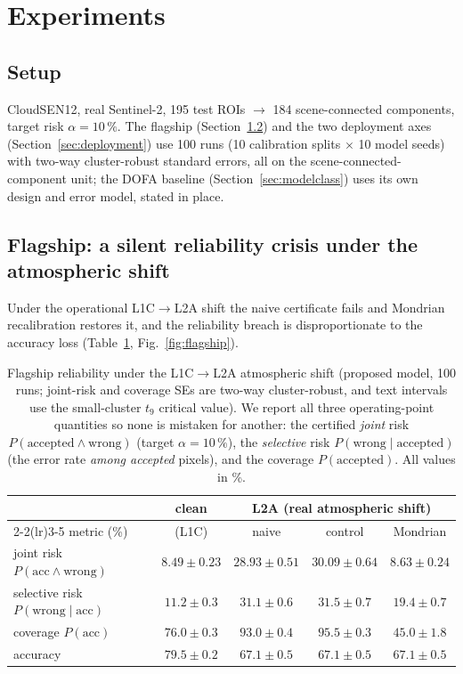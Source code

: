 \documentclass[preprint,3p,times]{elsarticle}
\begin{document}
\section{Experiments}
\subsection{Setup}
CloudSEN12, real Sentinel-2, 195 test ROIs $\to$ 184 scene-connected components, target risk $\alpha = 10\,\%$. The flagship (Section~\ref{sec:flagship}) and the two deployment axes (Section~\ref{sec:deployment}) use 100 runs (10 calibration splits $\times$ 10 model seeds) with two-way cluster-robust standard errors, all on the scene-connected-component unit; the DOFA baseline (Section~\ref{sec:modelclass}) uses its own design and error model, stated in place.

\subsection{Flagship: a silent reliability crisis under the atmospheric shift}
\label{sec:flagship}
Under the operational L1C$\to$L2A shift the naive certificate fails and Mondrian recalibration restores it, and the reliability breach is disproportionate to the accuracy loss (Table~\ref{tab:flagship}, Fig.~\ref{fig:flagship}).

\begin{table}[t]
\centering
\caption{Flagship reliability under the L1C$\to$L2A atmospheric shift (proposed model, 100 runs; joint-risk and coverage SEs are two-way cluster-robust, and text intervals use the small-cluster $t_9$ critical value). We report all three operating-point quantities so none is mistaken for another: the certified \emph{joint} risk $P(\text{accepted}\wedge\text{wrong})$ (target $\alpha = 10\,\%$), the \emph{selective} risk $P(\text{wrong}\mid\text{accepted})$ (the error rate \emph{among accepted} pixels), and the coverage $P(\text{accepted})$. All values in \%.}
\label{tab:flagship}
\begin{tabular}{lcccc}
\toprule
 & clean & \multicolumn{3}{c}{L2A (real atmospheric shift)} \\
\cmidrule(lr){2-2}\cmidrule(lr){3-5}
metric (\%) & (L1C) & naive & control & Mondrian \\
\midrule
joint risk $P(\mathrm{acc}\wedge\mathrm{wrong})$   & $8.49\pm0.23$ & $\mathbf{28.93 \pm 0.51}$ & $30.09 \pm 0.64$ & $\mathbf{8.63 \pm 0.24}$ \\
selective risk $P(\mathrm{wrong}\mid\mathrm{acc})$ & $11.2\pm0.3$ & $31.1\pm0.6$ & $31.5\pm0.7$ & $19.4\pm0.7$ \\
coverage $P(\mathrm{acc})$                          & $76.0\pm0.3$ & $93.0 \pm 0.4$ & $95.5 \pm 0.3$ & $45.0 \pm 1.8$ \\
accuracy                                            & $79.5\pm0.2$ & $67.1\pm0.5$ & $67.1\pm0.5$ & $67.1\pm0.5$ \\
\bottomrule
\end{tabular}
\end{table}
\end{document}
